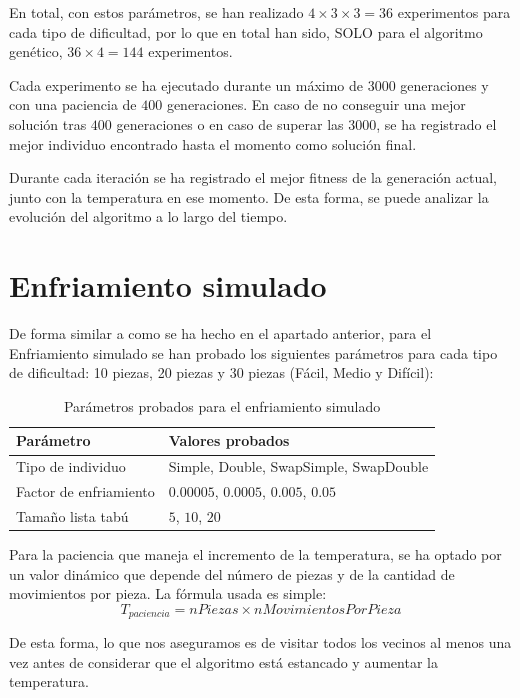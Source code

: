 \documentclass[11pt,spanish,listoffigures,listoftables]{tfgetsinf}
\begin{document}
En total, con estos parámetros, se han realizado $4 \times 3 \times 3 = 36$ experimentos para cada tipo de dificultad, por lo que en total han sido, SOLO para el algoritmo genético, $36 \times 4 = 144$ experimentos. 

Cada experimento se ha ejecutado durante un máximo de $3000$ generaciones y con una paciencia de $400$ generaciones. En caso de no conseguir una mejor solución tras $400$ generaciones o en caso de superar las $3000$, se ha registrado el mejor individuo encontrado hasta el momento como solución final.

Durante cada iteración se ha registrado el mejor fitness de la generación actual, junto con la temperatura en ese momento. De esta forma, se puede analizar la evolución del algoritmo a lo largo del tiempo.

\section{Enfriamiento simulado}
De forma similar a como se ha hecho en el apartado anterior, para el Enfriamiento simulado se han probado los siguientes parámetros para cada tipo de dificultad: 10 piezas, 20 piezas y 30 piezas (Fácil, Medio y Difícil):

\begin{table}[H]
    \centering
    \begin{tabular}{ll}
        \toprule
        \textbf{Parámetro} & \textbf{Valores probados} \\
        \midrule
        Tipo de individuo & Simple, Double, SwapSimple, SwapDouble \\
        Factor de enfriamiento & $0.00005$, $0.0005$, $0.005$, $0.05$ \\
        Tamaño lista tabú & $5$, $10$, $20$ \\
        \bottomrule
    \end{tabular}
    \caption{Parámetros probados para el enfriamiento simulado}
    \label{tab:parametros_sa}
\end{table}

Para la paciencia que maneja el incremento de la temperatura, se ha optado por un valor dinámico que depende del número de piezas y de la cantidad de movimientos por pieza. La fórmula usada es simple:
$$
T_{paciencia} = nPiezas \times nMovimientosPorPieza 
$$

De esta forma, lo que nos aseguramos es de visitar todos los vecinos al menos una vez antes de considerar que el algoritmo está estancado y aumentar la temperatura.
\end{document}
